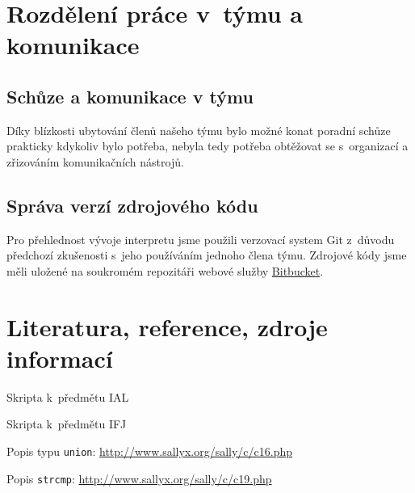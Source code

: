 \documentclass[12pt,a4paper,titlepage,final]{article}
\begin{document}
  \section{Rozdělení práce v~týmu a komunikace} \label{rozdeleni}

    \subsection{Schůze a komunikace v týmu}

    Díky blízkosti ubytování členů našeho týmu bylo možné konat poradní
    schůze prakticky kdykoliv bylo potřeba, nebyla tedy potřeba obtěžovat se
    s~organizací a zřizováním komunikačních nástrojů.

    \subsection{Správa verzí zdrojového kódu}

    Pro přehlednost vývoje interpretu jsme použili verzovací system Git
    z~důvodu předchozí zkušenosti s~jeho používáním jednoho člena týmu.
    Zdrojové kódy jsme měli uložené na soukromém repozitáři webové služby
    \href{http://bitbucket.org/}{Bitbucket}.
    \newpage

  \section{Literatura, reference, zdroje informací} \label{literatura}

    \begin{enumerate}[label={[\arabic*]}]
      \item Skripta k~předmětu IAL
      \item Skripta k~předmětu IFJ
      \item Popis typu \texttt{union}:
      \href{http://www.sallyx.org/sally/c/c16.php}
        {http://www.sallyx.org/sally/c/c16.php}
      \item Popis \texttt{strcmp}: 
        \href{http://www.sallyx.org/sally/c/c19.php}
          {http://www.sallyx.org/sally/c/c19.php}
    \end{enumerate}

\end{document}
